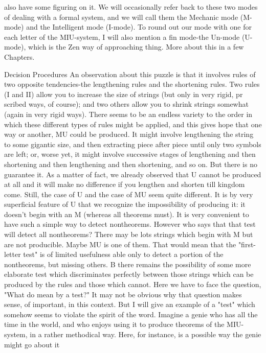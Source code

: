 also have some figuring on it. We will occasionally refer back to these two modes of dealing with a formal system, and we will call them the Mechanic mode (M-mode) and the Intelligent mode (I-mode). To round out our mode with one for each letter of the MIU-system, I will also mention a fin mode-the Un-mode (U-mode), which is the Zen way of approaching thing. More about this in a few Chapters. 



Decision Procedures An observation about this puzzle is that it involves rules of two opposite tendencies-the lengthening rules and the shortening rules. Two rules (I and II) allow you to increase the size of strings (but only in very rigid, pr scribed ways, of course); and two others allow you to shrink strings somewhat (again in very rigid ways). There seems to be an endless variety to the order in which these different types of rules might be applied, and this gives hope that one way or another, MU could be produced. It might involve lengthening the string to some gigantic size, and then extracting piece after piece until only two symbols are left; or, worse yet, it might involve successive stages of lengthening and then shortening and then lengthening and then shortening, and so on. But there is no guarantee it. As a matter of fact, we already observed that U cannot be produced at all and it will make no difference if you lengthen and shorten till kingdom come. Still, the case of U and the case of MU seem quite different. It is by very superficial feature of U that we recognize the impossibility of producing it: it doesn't begin with an M (whereas all theorems must). It is very convenient to have such a simple way to detect nontheorems. However who says that that test will detect all nontheorems? There may be lots strings which begin with M but are not producible. Maybe MU is one of them. That would mean that the "first-letter test" is of limited usefulness able only to detect a portion of the nontheorems, but missing others. B there remains the possibility of some more elaborate test which discriminates perfectly between those strings which can be produced by the rules and those which cannot. Here we have to face the question, "What do mean by a test?" It may not be obvious why that question makes sense, of important, in this context. But I will give an example of a "test" which somehow seems to violate the spirit of the word. Imagine a genie who has all the time in the world, and who enjoys using it to produce theorems of the MIU-system, in a rather methodical way. Here, for instance, is a possible way the genie might go about it 

